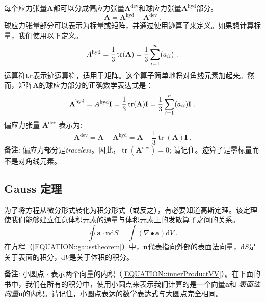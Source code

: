\documentclass[MathematicsNumericsDerivationsAndOpenFOAM.tex]{subfiles}
\begin{document}
	每个应力张量$\textbf{A}$都可以分成偏应力张量$\textbf{A}^\text{dev}$和球应力张量$\textbf{A}^\text{hyd}$部分。
%
%
\begin{equation}
  \textbf{A}
=
  \textbf{A}^\text{hyd}
+
  \textbf{A}^\text{dev}~.
  \label{EQUATION::deviatoricHydrostatic}
\end{equation}
%
%
	球应力张量部分可以表示为标量或矩阵，并通过使用迹算子来定义。如果想计算标量，我们使用以下定义。
%
%
\begin{equation}
  A^\mathrm{hyd}
=
  \frac{1}{3}\operatorname{tr}(\textbf{A})
=
  \frac{1}{3} \sum_{i=1}^{n}(a_{ii}) ~.
  \label{EQUATION::hydrostaticScalar}
\end{equation}
%
%
	运算符$\texttt{tr}$表示迹运算符，适用于矩阵。这个算子简单地将对角线元素加起来。然而，矩阵$\textbf{A}$的球应力部分的正确数学表达式是：
%
%
%
\begin{equation}
  \textbf{A}^\mathrm{hyd}
=
  A^\mathrm{hyd} \textbf{I}
=
  \frac{1}{3}\operatorname{tr}(\textbf{A})\textbf{I}
=
  \frac{1}{3} \sum_{i=1}^{n}(a_{ii})\textbf{I} ~.
  \label{EQUATION::hydrostaticMatrix}
\end{equation}
%
%
%
	偏应力张量 $\textbf{A}^\mathrm{dev}$ 表示为:
%
%
\begin{equation}
 \textbf{A}^\mathrm{dev}
=
 \textbf{A} - \textbf{A}^\mathrm{hyd}
=
 \textbf{A} - \frac{1}{3}\operatorname{tr}(\textbf{A})\textbf{I}~.
 \label{EQUATION::deviatoric}
\end{equation}
%
%
	\textbf{备注}: 偏应力部分是\textit{traceless}。因此，$\operatorname{tr}(\textbf{A}^\mathrm{dev}) = 0$; 请记住。迹算子是零标量而不是对角线元素。
	
%
%
%
%
%
\subsection{Gauss 定理}
%
%
	为了将方程从微分形式转化为积分形式（或反之），有必要知道高斯定理。该定理使我们能够建立任意体积元素的通量与体积元素上的发散算子之间的关系。
%
%
\begin{equation}
 \oint \textbf{a} \cdot \textbf{n} \mathrm{d}S
=
 \int (\nabla \bullet \textbf{a}) \mathrm{d}V~.
 \label{EQUATION::gausstheorem}
\end{equation}
%
%
	在方程（\ref{EQUATION::gausstheorem}）中，$\textbf{n}$代表指向外部的表面法向量，d$S$是关于表面的积分，d$V$是关于体积的积分。


	\textbf{备注}: 小圆点 $\cdot$ 	表示两个向量的内积（\ref{EQUATION::innerProductVV}）。在下面的书中，我们在所有的积分中，使用小圆点来表示我们计算的是一个向量\textbf{a}和 \textit{表面法向量}\textbf{n}的内积。请记住，小圆点表达的数学表达式与大圆点完全相同。
	


\end{document}
